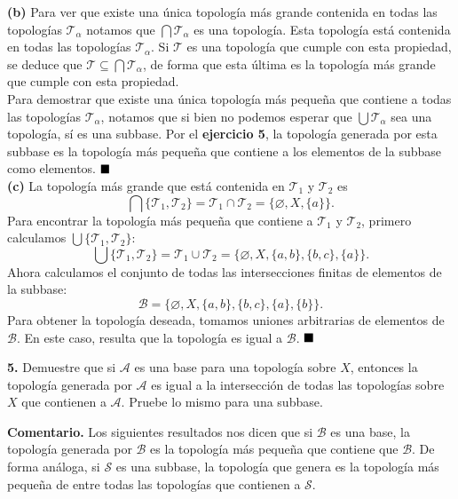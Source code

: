 \documentclass{article}
\begin{document}
\textbf{(b) } Para ver que existe una única topología más grande contenida en todas las topologías $\mathcal{T}_{\alpha}$ notamos que $\bigcap \mathcal{T}_{\alpha}$ es una topología. Esta topología está contenida en todas las topologías $\mathcal{T}_{\alpha}$. Si $\mathcal{T}$ es una topología que cumple con esta propiedad, se deduce que $\mathcal{T} \subseteq \bigcap \mathcal{T}_{\alpha} $, de forma que esta última es la topología más grande que cumple con esta propiedad.  \\

Para demostrar que existe una única topología más pequeña que contiene a todas las topologías $\mathcal{T}_{\alpha}$, notamos que si bien no podemos esperar que $\bigcup \mathcal{T}_{\alpha}$ sea una topología, sí es una subbase. Por el \textbf{ejercicio 5}, la topología generada por esta subbase es la topología más pequeña que contiene a los elementos de la subbase como elementos. $\hspace*{\fill} \blacksquare$\\

\textbf{(c)} La topología más grande que está contenida en $\mathcal{T}_{1}$ y $\mathcal{T}_{2}$ es
$$ \bigcap \{ \mathcal{T}_{1}, \mathcal{T}_{2} \}  =  \mathcal{T}_{1} \cap \mathcal{T}_{2} = \{ \varnothing, X,  \{a \} \}.$$
Para encontrar la topología más pequeña que contiene a $\mathcal{T}_{1}$ y $\mathcal{T}_{2}$, primero calculamos $\bigcup \{\mathcal{T}_{1}, \mathcal{T}_{2} \}$:
$$ \bigcup \{\mathcal{T}_{1}, \mathcal{T}_{2} \} = \mathcal{T}_{1} \cup \mathcal{T}_{2} = \{ \varnothing, X, \{a, b \}, \{b, c \},\{a \} \}.$$
Ahora calculamos el conjunto de todas las intersecciones finitas de elementos de la subbase:
$$\mathcal{B} = \{ \varnothing, X, \{a, b \}, \{b, c \},\{a \}, \{b \} \}.$$
Para obtener la topología deseada, tomamos uniones arbitrarias de elementos de $\mathcal{B}$. En este caso, resulta que la topología es igual a $\mathcal{B}$. $\hspace*{\fill} \blacksquare$\\
\vspace{0.5cm}
\begin{mybox}
	\textbf{5. } Demuestre que si $\mathcal{A}$ es una base para una topología sobre $X$, entonces la topología generada por $\mathcal{A}$ es igual a la intersección de todas las topologías sobre $X$ que contienen a $\mathcal{A}.$ Pruebe lo mismo para una subbase. 
\end{mybox}	

 \textbf{Comentario. } Los siguientes resultados nos dicen que si $\mathcal{B}$ es una base, la topología generada por $\mathcal{B}$ es la topología más pequeña que contiene que $\mathcal{B}$. De forma análoga, si $\mathcal{S}$ es una subbase, la topología que genera es la topología más pequeña de entre todas las topologías que contienen a $\mathcal{S}$. \\
\end{document}
